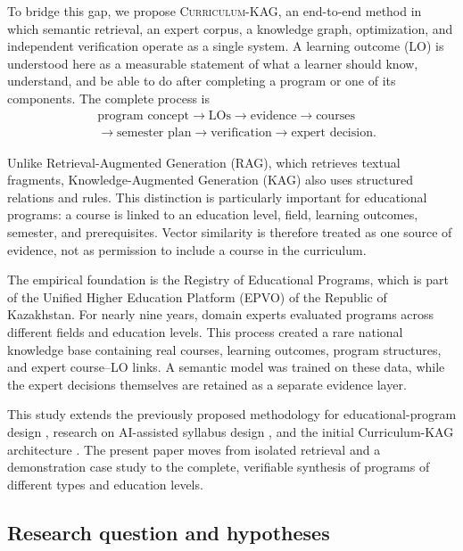 \documentclass[twoside,11pt]{article}
\newcommand{\systemname}{\textsc{Curriculum-KAG}}
\begin{document}
To bridge this gap, we propose \systemname{}, an end-to-end method in which semantic retrieval, an expert corpus, a knowledge graph, optimization, and independent verification operate as a single system. A learning outcome (LO) is understood here as a measurable statement of what a learner should know, understand, and be able to do after completing a program or one of its components. The complete process is
\begin{equation}
\begin{aligned}
  &\text{program concept}
  \rightarrow \text{LOs}
  \rightarrow \text{evidence}
  \rightarrow \text{courses}\\
  &\rightarrow \text{semester plan}
  \rightarrow \text{verification}
  \rightarrow \text{expert decision}.
\end{aligned}
  \label{eq:end-to-end-pipeline}
\end{equation}

Unlike Retrieval-Augmented Generation (RAG), which retrieves textual fragments, Knowledge-Augmented Generation (KAG) also uses structured relations and rules. This distinction is particularly important for educational programs: a course is linked to an education level, field, learning outcomes, semester, and prerequisites. Vector similarity is therefore treated as one source of evidence, not as permission to include a course in the curriculum.

The empirical foundation is the Registry of Educational Programs, which is part of the Unified Higher Education Platform (EPVO) of the Republic of Kazakhstan. For nearly nine years, domain experts evaluated programs across different fields and education levels. This process created a rare national knowledge base containing real courses, learning outcomes, program structures, and expert course--LO links. A semantic model was trained on these data, while the expert decisions themselves are retained as a separate evidence layer.

This study extends the previously proposed methodology for educational-program design \cite{Ibatov2017}, research on AI-assisted syllabus design \cite{Kozhanov2024Syllabus}, and the initial Curriculum-KAG architecture \cite{Kozhanov2026KAG}. The present paper moves from isolated retrieval and a demonstration case study to the complete, verifiable synthesis of programs of different types and education levels.

\subsection*{Research question and hypotheses}
\end{document}
